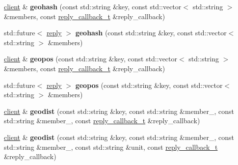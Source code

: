 \begin{DoxyCompactItemize}
\item 
\mbox{\label{classcpp__redis_1_1client_a37b20a863f276469d12dc47063d56055}} 
\hyperlink{classcpp__redis_1_1client}{client} \& {\bfseries geohash} (const std\+::string \&key, const std\+::vector$<$ std\+::string $>$ \&members, const \hyperlink{classcpp__redis_1_1client_a061a1140d36d2eaeda82b09a0bb3f9f2}{reply\+\_\+callback\+\_\+t} \&reply\+\_\+callback)
\item 
\mbox{\label{classcpp__redis_1_1client_ac421d4e696a67c1295a6b55ceaeab680}} 
std\+::future$<$ \hyperlink{classcpp__redis_1_1reply}{reply} $>$ {\bfseries geohash} (const std\+::string \&key, const std\+::vector$<$ std\+::string $>$ \&members)
\item 
\mbox{\label{classcpp__redis_1_1client_ae4bba1470cf357a8c4d1f8360a9c8b79}} 
\hyperlink{classcpp__redis_1_1client}{client} \& {\bfseries geopos} (const std\+::string \&key, const std\+::vector$<$ std\+::string $>$ \&members, const \hyperlink{classcpp__redis_1_1client_a061a1140d36d2eaeda82b09a0bb3f9f2}{reply\+\_\+callback\+\_\+t} \&reply\+\_\+callback)
\item 
\mbox{\label{classcpp__redis_1_1client_a8166870c7f3b6c5152eb85a233d78368}} 
std\+::future$<$ \hyperlink{classcpp__redis_1_1reply}{reply} $>$ {\bfseries geopos} (const std\+::string \&key, const std\+::vector$<$ std\+::string $>$ \&members)
\item 
\mbox{\label{classcpp__redis_1_1client_a56df27bbe73c7738854150359ba39958}} 
\hyperlink{classcpp__redis_1_1client}{client} \& {\bfseries geodist} (const std\+::string \&key, const std\+::string \&member\+\_, const std\+::string \&member\+\_, const \hyperlink{classcpp__redis_1_1client_a061a1140d36d2eaeda82b09a0bb3f9f2}{reply\+\_\+callback\+\_\+t} \&reply\+\_\+callback)
\item 
\mbox{\label{classcpp__redis_1_1client_ade755123f2de81995df6a66a363a0dfb}} 
\hyperlink{classcpp__redis_1_1client}{client} \& {\bfseries geodist} (const std\+::string \&key, const std\+::string \&member\+\_, const std\+::string \&member\+\_, const std\+::string \&unit, const \hyperlink{classcpp__redis_1_1client_a061a1140d36d2eaeda82b09a0bb3f9f2}{reply\+\_\+callback\+\_\+t} \&reply\+\_\+callback)

\end{DoxyCompactItemize}
